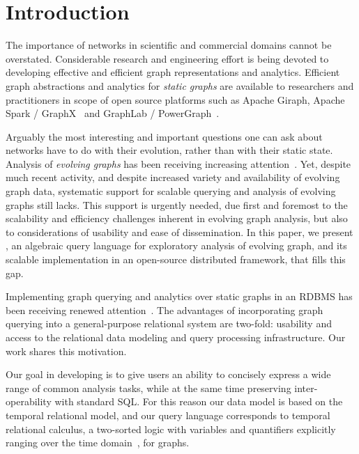 \section{Introduction}
\label{sec:intro}

The importance of networks in scientific and commercial domains cannot
be overstated.  Considerable research and engineering effort is being
devoted to developing effective and efficient graph representations
and analytics.  Efficient graph abstractions and analytics for {\em
  static graphs} are available to researchers and practitioners in
scope of open source platforms such as Apache Giraph, Apache Spark /
GraphX~\cite{DBLP:conf/osdi/GonzalezXDCFS14} and GraphLab /
PowerGraph~\cite{DBLP:conf/osdi/GonzalezLGBG12}.

Arguably the most interesting and important questions one can ask
about networks have to do with their evolution, rather than with their
static state.  Analysis of {\em evolving graphs} has been receiving
increasing
attention~\cite{DBLP:journals/csur/AggarwalS14,Chan2008,Kan2009,Miao2015,Ren2011,Semertzidis2015}.
Yet, despite much recent activity, and despite increased variety and
availability of evolving graph data, systematic support for scalable
querying and analysis of evolving graphs still lacks.  This support is
urgently needed, due first and foremost to the scalability and
efficiency challenges inherent in evolving graph analysis, but also to
considerations of usability and ease of dissemination.  In this paper,
we present \ql, an algebraic query language for exploratory analysis
of evolving graph, and its scalable implementation in an open-source
distributed framework, that fills this gap.

Implementing graph querying and analytics over static graphs in an
RDBMS has been receiving renewed
attention~\cite{DBLP:conf/sigmod/AbergerTOR16,DBLP:conf/sigmod/SunFSKHX15,DBLP:journals/pvldb/Xirogiannopoulos15}. The
advantages of incorporating graph querying into a general-purpose
relational system are two-fold: usability and access to the relational
data modeling and query processing infrastructure.  Our work shares
this motivation. 

Our goal in developing \ql is to give users an ability to concisely
express a wide range of common analysis tasks, while at the same time
preserving inter-operability with standard SQL.  For this reason our
data model is based on the temporal relational model, and our query
language corresponds to temporal relational calculus, a two-sorted
logic with variables and quantifiers explicitly ranging over the time
domain~\cite{DBLP:reference/db/Toman09}, for graphs.

